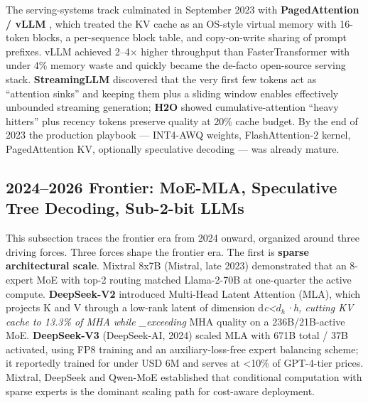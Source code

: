 \documentclass{article}
\begin{document}
The serving-systems track culminated in September 2023 with \textbf{PagedAttention / vLLM} \citep{kwon20232023}, which treated the KV cache as an OS-style virtual memory with 16-token blocks, a per-sequence block table, and copy-on-write sharing of prompt prefixes. vLLM achieved 2--4× higher throughput than FasterTransformer with under 4\% memory waste and quickly became the de-facto open-source serving stack. \textbf{StreamingLLM} \citep{xiao2024efficientstreaming} discovered that the very first few tokens act as ``attention sinks'' and keeping them plus a sliding window enables effectively unbounded streaming generation; \textbf{H2O} \citep{zhang20232023} showed cumulative-attention ``heavy hitters'' plus recency tokens preserve quality at 20\% cache budget. By the end of 2023 the production playbook --- INT4-AWQ weights, FlashAttention-2 kernel, PagedAttention KV, optionally speculative decoding --- was already mature.

\subsection{2024--2026 Frontier: MoE-MLA, Speculative Tree Decoding, Sub-2-bit LLMs}\label{frontier-moe-mla-speculative-tree-decoding-sub-2-bit-llms}

This subsection traces the frontier era from 2024 onward, organized around three driving forces. Three forces shape the frontier era. The first is \textbf{sparse architectural scale}. Mixtral 8x7B (Mistral, late 2023) demonstrated that an 8-expert MoE with top-2 routing matched Llama-2-70B at one-quarter the active compute. \textbf{DeepSeek-V2} \citep{liu20242024} introduced Multi-Head Latent Attention (MLA), which projects K and V through a low-rank latent of dimension d\emph{c\textless{}\(d_h\)·h, cutting KV cache to 13.3\% of MHA while \_exceeding} MHA quality on a 236B/21B-active MoE. \textbf{DeepSeek-V3} (DeepSeek-AI, 2024) scaled MLA with 671B total / 37B activated, using FP8 training and an auxiliary-loss-free expert balancing scheme; it reportedly trained for under USD 6M and serves at \textless10\% of GPT-4-tier prices. Mixtral, DeepSeek and Qwen-MoE established that conditional computation with sparse experts is the dominant scaling path for cost-aware deployment.
\end{document}
